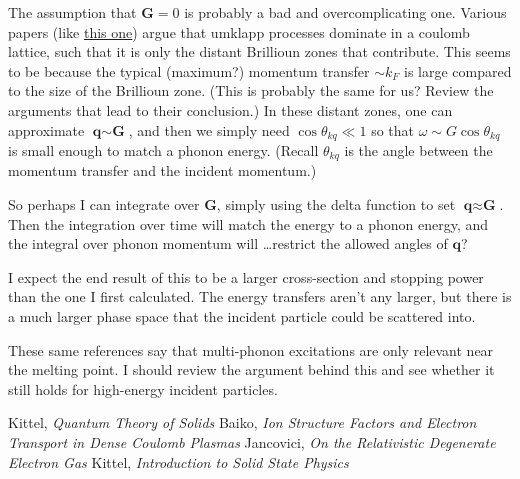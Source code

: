 \documentclass{article}
\begin{document}
\begin{mdframed}[style=MyFrame]
The assumption that $\textbf{G} = 0$ is probably a bad and overcomplicating one. Various papers (like \href{http://articles.adsabs.harvard.edu/cgi-bin/nph-iarticle_query?1980SvA....24..303Y&defaultprint=YES&filetype=.pdf}{this one}) argue that umklapp processes dominate in a coulomb lattice, such that it is only the distant Brillioun zones that contribute. This seems to be because the typical (maximum?) momentum transfer $ \sim k_F$ is large compared to the size of the Brillioun zone. (This is probably the same for us? Review the arguments that lead to their conclusion.) In these distant zones, one can approximate $\textbf{q} \sim \textbf{G}$, and then we simply need $\cos\theta_{kq} \ll1$ so that $\omega \sim G \cos\theta_{kq}$ is small enough to match a phonon energy. (Recall $\theta_{kq}$ is the angle between the momentum transfer and the incident momentum.)

So perhaps I can integrate over $\textbf{G}$, simply using the delta function to set $\textbf{q} \approx \textbf{G}$. Then the integration over time will match the energy to a phonon energy, and the integral over phonon momentum will \ldots restrict the allowed angles of $\textbf{q}$?

I expect the end result of this to be a larger cross-section and stopping power than the one I first calculated. The energy transfers aren't any larger, but there is a much larger phase space that the incident particle could be scattered into.

These same references say that multi-phonon excitations are only relevant near the melting point. I should review the argument behind this and see whether it still holds for high-energy incident particles.
\end{mdframed}





\begin{thebibliography}{1}
   Kittel, \emph{Quantum Theory of Solids}
   Baiko, \emph{Ion Structure Factors and Electron Transport in Dense Coulomb Plasmas}
   Jancovici, \emph{On the Relativistic Degenerate Electron Gas}
   Kittel, \emph{Introduction to Solid State Physics}
\end{thebibliography}
\end{document}
